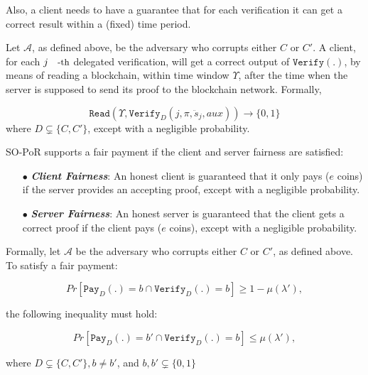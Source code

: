 Also, a client needs to have a guarantee that for each verification it can get a correct result within a (fixed) time period. 

\begin{definition}\label{real-time Detection} Let $\mathcal{A}$, as defined above, be the adversary who corrupts either $C$ or $C'$.
A client, for each $j\text{\small{-th}}$ delegated verification, will get a correct output of  $\mathtt{Verify(.)}$, by  means of reading a blockchain, within time window $\Upsilon$, after the time when the server is supposed to send  its proof  to the blockchain network. Formally,

$$\mathtt{Read}(\Upsilon,\mathtt{Verify}_{\scriptscriptstyle D}(j,\pi,\ddot{s}_{\scriptscriptstyle j},aux))\rightarrow \{0,1\}$$
where $D\subsetneq\{C,C'\}$, except with a negligible probability. 
\end{definition}


\begin{definition}\label{Fair-Payment}  SO-PoR supports a fair payment if the client and server fairness are satisfied: 

\begin{itemize}
\item[$\bullet$] \textit{\textbf{Client Fairness}}: An honest client is guaranteed that it only pays ($e$ coins) if the server provides an accepting proof, except with a negligible probability. 
\item[$\bullet$]\textit{\textbf{Server Fairness}}: An honest server is guaranteed that the client gets a correct proof if the client pays ($e$ coins),   except with a negligible probability. 
\end{itemize}
Formally, let $\mathcal{A}$ be the adversary who corrupts either $C$ or $C'$, as defined above. To satisfy a fair payment:

\begin{equation}
Pr[\mathtt{Pay}_{\scriptscriptstyle D}(.)=b 	\cap  \mathtt{Verify}_{\scriptscriptstyle D}(.)=b]\geq 1-\mu(\lambda'),   
\end{equation}

the following inequality must hold:

\begin{equation}\label{inequ::fair-payment}
Pr[\mathtt{Pay}_{\scriptscriptstyle D}(.)=b' 	\cap \mathtt{Verify}_{\scriptscriptstyle D}(.)=b] \leq \mu(\lambda'),
\end{equation}

where $D\subsetneq\{C,C'\},b\neq b'$, and $b, b'\subsetneq\{0,1\}$
\end{definition}

